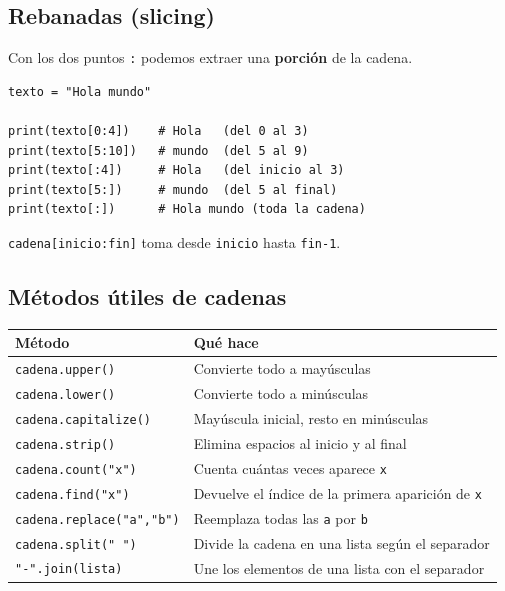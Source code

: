 \documentclass[11pt,a4paper]{article}
\begin{document}
\subsection{Rebanadas (slicing)}

Con los dos puntos \texttt{:} podemos extraer una \textbf{porción} de la cadena.

\begin{cajaEjemplo}
\begin{lstlisting}[style=pythonStyle, caption={Rebanadas}]
texto = "Hola mundo"

print(texto[0:4])    # Hola   (del 0 al 3)
print(texto[5:10])   # mundo  (del 5 al 9)
print(texto[:4])     # Hola   (del inicio al 3)
print(texto[5:])     # mundo  (del 5 al final)
print(texto[:])      # Hola mundo (toda la cadena)
\end{lstlisting}

\texttt{cadena[inicio:fin]} toma desde \texttt{inicio} hasta \texttt{fin-1}.
\end{cajaEjemplo}

\subsection{Métodos útiles de cadenas}

\begin{table}[h]
\centering
\begin{tabularx}{\textwidth}{l X}
\toprule
\textbf{Método} & \textbf{Qué hace} \\
\midrule
\texttt{cadena.upper()} & Convierte todo a mayúsculas \\
\texttt{cadena.lower()} & Convierte todo a minúsculas \\
\texttt{cadena.capitalize()} & Mayúscula inicial, resto en minúsculas \\
\texttt{cadena.strip()} & Elimina espacios al inicio y al final \\
\texttt{cadena.count("x")} & Cuenta cuántas veces aparece \texttt{x} \\
\texttt{cadena.find("x")} & Devuelve el índice de la primera aparición de \texttt{x} \\
\texttt{cadena.replace("a","b")} & Reemplaza todas las \texttt{a} por \texttt{b} \\
\texttt{cadena.split(" ") } & Divide la cadena en una lista según el separador \\
\texttt{"-".join(lista)} & Une los elementos de una lista con el separador \\
\bottomrule
\end{tabularx}
\end{table}
\end{document}
